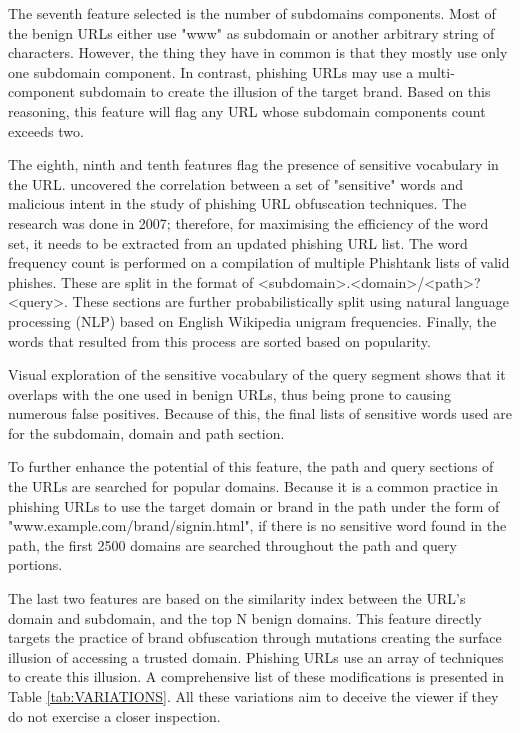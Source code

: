 The seventh feature selected is the number of subdomains components. Most of the benign URLs either use "www" as subdomain or another arbitrary string of characters. However, the thing they have in common is that they mostly use only one subdomain component. In contrast, phishing URLs may use a multi-component subdomain to create the illusion of the target brand. Based on this reasoning, this feature will flag any URL whose subdomain components count exceeds two.

The eighth, ninth and tenth features flag the presence of sensitive vocabulary in the URL. \cite{Sujata_Garera} uncovered the correlation between a set of "sensitive" words and malicious intent in the study of phishing URL obfuscation techniques. The research was done in 2007; therefore, for maximising the efficiency of the word set, it needs to be extracted from an updated phishing URL list.
The word frequency count is performed on a compilation of multiple Phishtank lists of valid phishes. These are split in the format of <subdomain>.<domain>/<path>?<query>. These sections are further probabilistically split using natural language processing (NLP) based on English Wikipedia unigram frequencies. Finally, the words that resulted from this process are sorted based on popularity.

Visual exploration of the sensitive vocabulary of the query segment shows that it overlaps with the one used in benign URLs, thus being prone to causing numerous false positives. Because of this, the final lists of sensitive words used are for the subdomain, domain and path section.

To further enhance the potential of this feature, the path and query sections of the URLs are searched for popular domains. Because it is a common practice in phishing URLs to use the target domain or brand in the path under the form of "www.example.com/brand/signin.html", if there is no sensitive word found in the path, the first 2500 domains are searched throughout the path and query portions.

The last two features are based on the similarity index between the URL's domain and subdomain, and the top N benign domains. This feature directly targets the practice of brand obfuscation through mutations creating the surface illusion of accessing a trusted domain.
Phishing URLs use an array of techniques to create this illusion. A comprehensive list of these modifications is presented in Table \ref{tab:VARIATIONS}. All these variations aim to deceive the viewer if they do not exercise a closer inspection.


